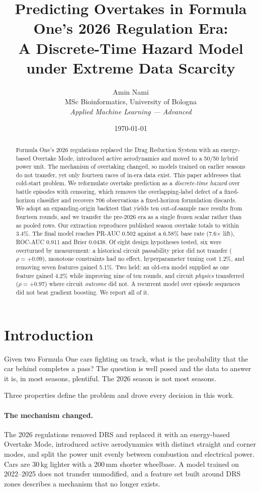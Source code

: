 \documentclass[11pt,a4paper]{article}
\title{\bfseries Predicting Overtakes in Formula One's 2026 Regulation Era:\\
\large A Discrete-Time Hazard Model under Extreme Data Scarcity}
\author{Amin Nami\\
\small MSc Bioinformatics, University of Bologna\\
\small \emph{Applied Machine Learning --- Advanced}}
\date{\today}
\newcommand{\prauc}{PR\nobreakdash-AUC}
\newcommand{\rocauc}{ROC\nobreakdash-AUC}
\begin{document}
\maketitle

\begin{abstract}
\noindent
Formula One's 2026 regulations replaced the Drag Reduction System with an
energy-based Overtake Mode, introduced active aerodynamics and moved to a
50/50 hybrid power unit. The mechanism of overtaking changed, so
models trained on earlier seasons do not transfer, yet only fourteen races of
in-era data exist. This paper addresses that cold-start problem. We reformulate
overtake prediction as a \emph{discrete-time hazard} over battle episodes with
censoring, which removes the overlapping-label defect of a fixed-horizon
classifier and recovers 706 observations a fixed-horizon formulation
discards. We adopt an expanding-origin backtest that yields ten out-of-sample
race results from fourteen rounds, and we transfer the pre-2026 era as a single
frozen scalar rather than as pooled rows. Our extraction reproduces published
season overtake totals to within 3.4\%. The final model reaches
\prauc{} 0.502 against a 6.58\% base rate (7.6$\times$
lift), \rocauc{} 0.911 and Brier 0.0438. Of eight design hypotheses
tested, six were overturned by measurement: a historical circuit passability
prior did not transfer ($\rho=+0.09$), monotone constraints had no effect,
hyperparameter tuning cost 1.2\%, and removing seven features
gained 5.1\%. Two held: an old-era model supplied as one feature
gained 4.2\% while improving nine of ten rounds, and circuit
\emph{physics} transferred ($\rho=+0.97$) where circuit \emph{outcome} did not.
A recurrent model over episode sequences did not beat gradient boosting. We
report all of it.
\end{abstract}

\section{Introduction}

Given two Formula One cars fighting on track, what is the probability that the
car behind completes a pass? The question is well posed and the data to answer
it is, in most seasons, plentiful. The 2026 season is not most seasons.

Three properties define the problem and drove every decision in this work.

\paragraph{The mechanism changed.} The 2026 regulations \citep{fia2026} removed
DRS and replaced it with an energy-based Overtake Mode, introduced active
aerodynamics with distinct straight and corner modes, and split the power unit
evenly between combustion and electrical power. Cars are 30\,kg
lighter with a 200\,mm shorter wheelbase. A model trained on
2022--2025 does not transfer unmodified, and a feature set built
around DRS zones describes a mechanism that no longer exists.
\end{document}
